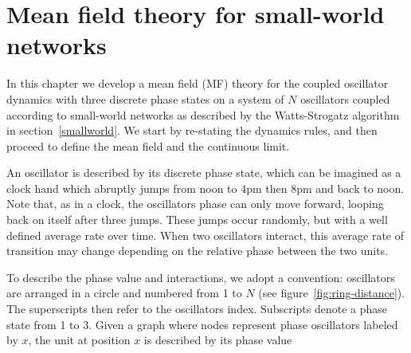 \chapter{Mean field theory for small-world networks}

\begin{table}[ht] 
    \centering
    \caption{Definitions table}
\end{table}


In this chapter we develop a mean field (MF) theory for the coupled oscillator dynamics with three discrete phase states on a system of
$N$ oscillators coupled according to small-world networks as described by the Watts-Strogatz algorithm in section~\ref{smallworld}. We
start by re-stating the dynamics rules, and then proceed to define the mean field and the continuous limit.

An oscillator is described by its discrete phase state, which can be imagined as a clock hand which abruptly jumps from noon to 4pm
then 8pm and back to noon. Note that, as in a clock, the oscillators phase can only move forward, looping back on itself after three
jumps. These jumps occur randomly, but with a well defined average rate over time. When two oscillators interact, this average rate of
transition may change depending on the relative phase between the two units.

To describe the phase value and interactions, we adopt a convention: oscillators are arranged in a circle and numbered from 1 to $N$
(see figure~\ref{fig:ring-distance}).  The superscripts then refer to the oscillators index. Subscripts denote a phase state from 1 to
3. Given a graph where nodes represent phase oscillators labeled by $x$, the unit at position $x$ is described by its phase value

